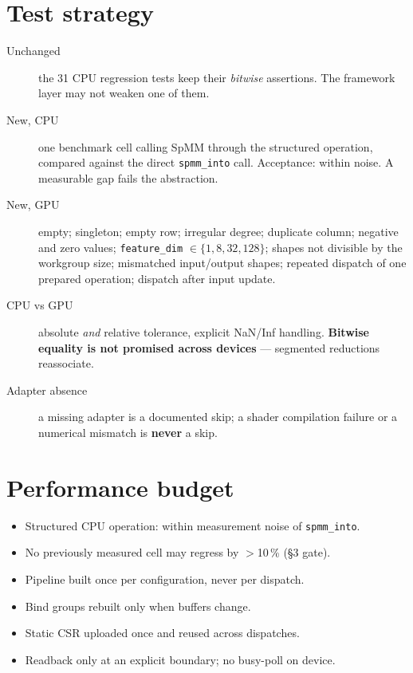 \documentclass[11pt,a4paper]{article}
\begin{document}
\section{Test strategy}

\begin{description}
  \item[Unchanged] the 31 CPU regression tests keep their \emph{bitwise}
    assertions. The framework layer may not weaken one of them.
  \item[New, CPU] one benchmark cell calling SpMM through the structured
    operation, compared against the direct \texttt{spmm\_into} call. Acceptance:
    within noise. A measurable gap fails the abstraction.
  \item[New, GPU] empty; singleton; empty row; irregular degree; duplicate
    column; negative and zero values; \texttt{feature\_dim} $\in
    \{1,8,32,128\}$; shapes not divisible by the workgroup size; mismatched
    input/output shapes; repeated dispatch of one prepared operation; dispatch
    after input update.
  \item[CPU vs GPU] absolute \emph{and} relative tolerance, explicit NaN/Inf
    handling. \textbf{Bitwise equality is not promised across devices} ---
    segmented reductions reassociate.
  \item[Adapter absence] a missing adapter is a documented skip; a shader
    compilation failure or a numerical mismatch is \textbf{never} a skip.
\end{description}

\section{Performance budget}

\begin{itemize}
  \item Structured CPU operation: within measurement noise of \texttt{spmm\_into}.
  \item No previously measured cell may regress by $>$10\,\% (\S3 gate).
  \item Pipeline built once per configuration, never per dispatch.
  \item Bind groups rebuilt only when buffers change.
  \item Static CSR uploaded once and reused across dispatches.
  \item Readback only at an explicit boundary; no busy-poll on device.
\end{itemize}
\end{document}

